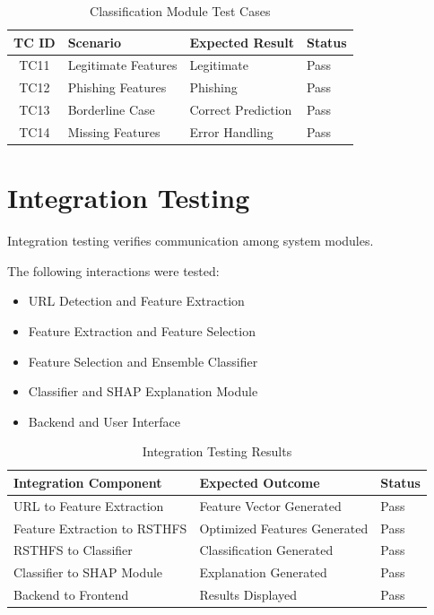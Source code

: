 \documentclass[12pt]{report}
\begin{document}
\begin{table}[H]
\centering
\caption{Classification Module Test Cases}
\begin{tabular}{|c|p{4cm}|p{2cm}|p{2cm}|}
\hline
TC ID & Scenario & Expected Result & Status \\
\hline
TC11 & Legitimate Features & Legitimate & Pass \\
\hline
TC12 & Phishing Features & Phishing & Pass \\
\hline
TC13 & Borderline Case & Correct Prediction & Pass \\
\hline
TC14 & Missing Features & Error Handling & Pass \\
\hline
\end{tabular}
\end{table}

\section{Integration Testing}

Integration testing verifies communication among system modules.

The following interactions were tested:

\begin{itemize}
    \item URL Detection and Feature Extraction
    \item Feature Extraction and Feature Selection
    \item Feature Selection and Ensemble Classifier
    \item Classifier and SHAP Explanation Module
    \item Backend and User Interface
\end{itemize}

\begin{table}[H]
\centering
\caption{Integration Testing Results}
\begin{tabular}{|p{5cm}|p{3cm}|p{2cm}|}
\hline
Integration Component & Expected Outcome & Status \\
\hline
URL to Feature Extraction & Feature Vector Generated & Pass \\
\hline
Feature Extraction to RSTHFS & Optimized Features Generated & Pass \\
\hline
RSTHFS to Classifier & Classification Generated & Pass \\
\hline
Classifier to SHAP Module & Explanation Generated & Pass \\
\hline
Backend to Frontend & Results Displayed & Pass \\
\hline
\end{tabular}
\end{table}
\end{document}
